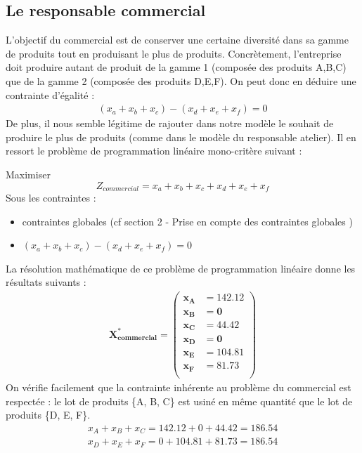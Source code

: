 \documentclass[12pt]{article}
\begin{document}
\subsection{Le responsable commercial}
L'objectif du commercial est de conserver une certaine diversité dans sa gamme de produits tout en produisant le plus de produits. Concrètement, l'entreprise doit produire autant de produit de la gamme 1 (composée des produits A,B,C) que de la gamme 2 (composée des produits D,E,F).
On peut donc en déduire une contrainte d'égalité :
\begin{align*} 
(x_{a} + x_{b} + x_{c}) - (x_{d} + x_{e} + x_{f}) = 0
\end{align*}
De plus, il nous semble légitime de rajouter dans notre modèle le souhait de produire le plus de produits (comme dans le modèle du responsable atelier).
Il en ressort le problème de programmation linéaire mono-critère suivant :
\begin{tcolorbox}
Maximiser
\begin{equation*}
 Z_{commercial}=x_{a} + x_{b} + x_{c} + x_{d} + x_{e} + x_{f}
\end{equation*}
Sous les contraintes :
\begin{itemize}
\item contraintes globales (cf section 2 - Prise en compte des contraintes globales )
\item $(x_{a} + x_{b} + x_{c}) - (x_{d} + x_{e} + x_{f}) = 0$
\end{itemize}
\end{tcolorbox}
La résolution mathématique de ce problème de programmation linéaire donne les résultats suivants :
\begin{align*}
\boldsymbol{X^{*}_{commercial} = 
   \left (
   \begin{aligned}
      x_{A} &= 142.12 \\
      x_{B} &= 0 \\
      x_{C} &= 44.42 \\
      x_{D} &= 0 \\
      x_{E} &= 104.81 \\
      x_{F} &= 81.73 \\
   \end{aligned}
   \right )
 } 
\end{align*}
On vérifie facilement que la contrainte inhérente au problème du commercial est respectée : le lot de produits \{A, B, C\} est usiné en même quantité que le lot de produits \{D, E, F\}. 
\begin{align*}
x_{A} + x_{B} + x_{C} = 142.12 + 0 + 44.42 = 186.54 \\
x_{D} + x_{E} + x_{F} = 0 + 104.81 + 81.73 = 186.54
\end{align*}
\end{document}
